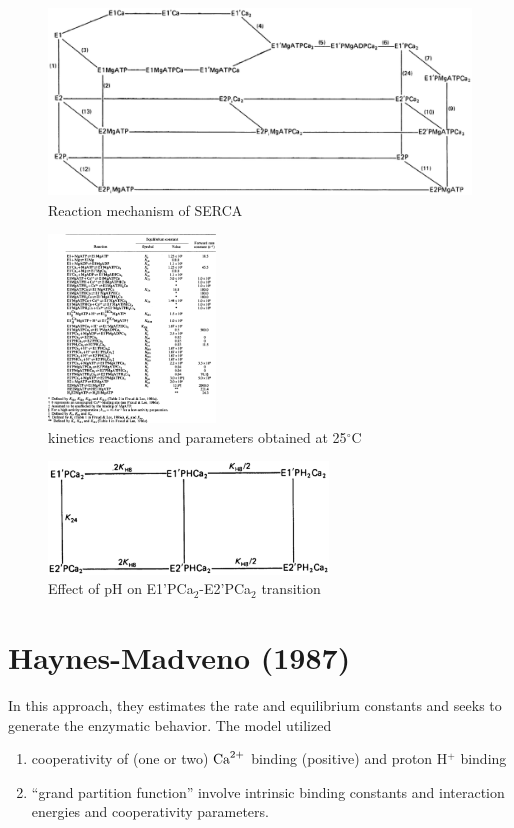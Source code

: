 \begin{figure}[hbt]
  \centerline{\includegraphics[height=5cm,
    angle=0]{./images/serca_scheme.eps}}
\caption{Reaction mechanism of SERCA}
\label{fig:serca_gould}
\end{figure}

\begin{figure}[hbt]
  \centerline{\includegraphics[height=5cm,
    angle=0]{./images/gould_serca_reaction.eps}}
\caption{kinetics reactions and parameters obtained at 25$^\circ$C}
\label{fig:kinetic_param_serca_gould}
\end{figure}

\begin{figure}[hbt]
  \centerline{\includegraphics[height=3cm,
    angle=0]{./images/gould_effect_pH.eps}}
 \caption{Effect of pH on E1'PCa$_2$-E2'PCa$_2$ transition}
\label{fig:gould_effect_pH}
\end{figure}


\section{Haynes-Madveno (1987)}
\label{sec:haynes-madveno-1987}


In this approach, they estimates the rate and equilibrium constants
and seeks to generate the enzymatic behavior. The model utilized
\begin{enumerate}
\item cooperativity of (one or two) ${\text{Ca}^{2+}}$ binding (positive) and
  proton H$^+$ binding
\item ``grand partition function'' involve intrinsic binding constants
  and interaction energies and cooperativity parameters. 
\end{enumerate}

